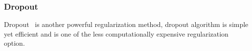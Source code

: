 \subsubsection{Dropout}

Dropout~\cite{JMLR:v15:srivastava14a} is another powerful regularization method, dropout algorithm is simple yet efficient and is one of the less computationally expensive regularization option. 